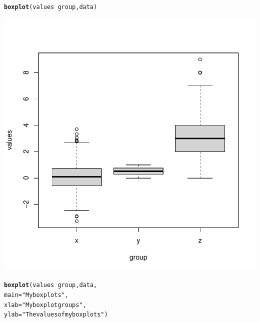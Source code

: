 \documentclass{article}\usepackage[]{graphicx}\usepackage[]{xcolor}
\makeatletter
\def\maxwidth{ %
  \ifdim\Gin@nat@width>\linewidth
    \linewidth
  \else
    \Gin@nat@width
  \fi
}
\newcommand{\hlstr}[1]{\textcolor[rgb]{0.192,0.494,0.8}{#1}}%
\newcommand{\hlopt}[1]{\textcolor[rgb]{0,0,0}{#1}}%
\newcommand{\hlstd}[1]{\textcolor[rgb]{0.345,0.345,0.345}{#1}}%
\newcommand{\hlkwc}[1]{\textcolor[rgb]{0.333,0.667,0.333}{#1}}%
\newcommand{\hlkwd}[1]{\textcolor[rgb]{0.737,0.353,0.396}{\textbf{#1}}}%
\newenvironment{kframe}{%
 \def\at@end@of@kframe{}%
 \ifinner\ifhmode%
  \def\at@end@of@kframe{\end{minipage}}%
  \begin{minipage}{\columnwidth}%
 \fi\fi%
 \def\FrameCommand##1{\hskip\@totalleftmargin \hskip-\fboxsep
 \colorbox{shadecolor}{##1}\hskip-\fboxsep
     \hskip-\linewidth \hskip-\@totalleftmargin \hskip\columnwidth}%
 \MakeFramed {\advance\hsize-\width
   \@totalleftmargin\z@ \linewidth\hsize
   \@setminipage}}%
 {\par\unskip\endMakeFramed%
 \at@end@of@kframe}
\newenvironment{knitrout}{}{} %
\makeatother
\begin{document}
\begin{knitrout}
{}


\begin{kframe}\begin{alltt}
\hlkwd{boxplot}\hlstd{(values} \hlopt{~} \hlstd{group, data)}
\end{alltt}
\end{kframe}

{\centering \includegraphics[width=\maxwidth]{figure/unnamed-chunk-1-2} 

}


\begin{kframe}\begin{alltt}
\hlkwd{boxplot}\hlstd{(values} \hlopt{~} \hlstd{group, data,}
        \hlkwc{main} \hlstd{=} \hlstr{"My boxplots"}\hlstd{,}
        \hlkwc{xlab} \hlstd{=} \hlstr{"My boxplot groups"}\hlstd{,}
        \hlkwc{ylab} \hlstd{=} \hlstr{"The values of my boxplots"}\hlstd{)}
\end{alltt}
\end{kframe}


\end{knitrout}
\end{document}

